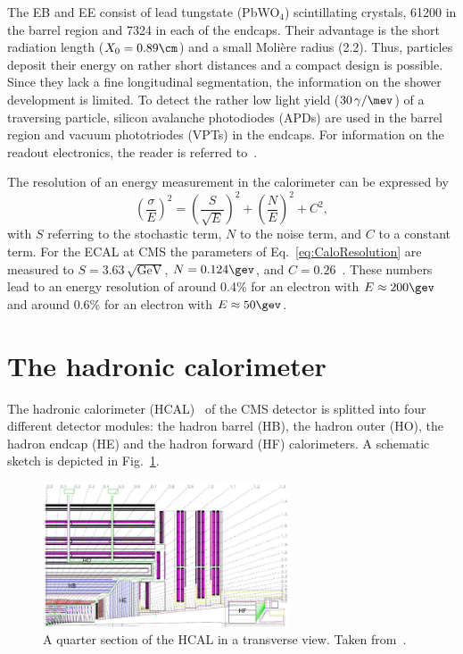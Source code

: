 The EB and EE consist of lead tungstate (PbWO$_4$) scintillating crystals, 61200 in the barrel region and 7324 in each of the endcaps. 
Their advantage is the short radiation length ($X_0=0.89\cm$) and a small Moli\`ere radius (2.2\cm).
Thus, particles deposit their energy on rather short distances and a compact design is possible.
Since they lack a fine longitudinal segmentation, the information on the shower development is limited.
To detect the rather low light yield ($30\,\gamma/\mev$) of a traversing particle, silicon avalanche photodiodes (APDs) are used in the barrel region and vacuum  phototriodes (VPTs) in the endcaps.
For information on the readout electronics, the reader is referred to~\cite{bib:CMS:TDR_2006}.

The resolution of an energy measurement in the calorimeter can be expressed by 
\begin{equation}
\label{eq:CaloResolution}
\left( \frac{\sigma}{E} \right)^2 = \left( \frac{S}{\sqrt{E}} \right)^2 + \left( \frac{N}{E} \right)^2 +C^2,
\end{equation}
with $S$ referring to the stochastic term, $N$ to the noise term, and $C$ to a constant term.
For the ECAL at CMS the parameters of Eq.~\eqref{eq:CaloResolution} are measured to $S=3.63\,\sqrt{\text{GeV}}$, $N=0.124\gev$, and $C=0.26$~\cite{bib:CMS:TDR_2006}. 
These numbers lead to an energy resolution of around 0.4\% for an electron with $E \approx 200\gev$ and around 0.6\% for an electron with $E \approx 50\gev$.

\section{The hadronic calorimeter}
The hadronic calorimeter (HCAL)~\cite{bib:CMS:TDR_2006,bib:CMS:TDR_HCAL} of the CMS detector is splitted into four different detector modules: the hadron barrel (HB), the hadron outer (HO), the hadron endcap (HE) and the hadron forward (HF) calorimeters.
A schematic sketch is depicted in Fig.~\ref{fig:HCAL}.
\begin{figure}[!ht]
  \centering
      \includegraphics[width=0.65\textwidth]{figures/experiment/CMS/fig_HCALdiagram_smaller_size.png}
  \caption{A quarter section of the HCAL in a transverse view. Taken from~\cite{bib:CMS:HCAL_Performance_2009}.}  
  \label{fig:HCAL}
\end{figure}

